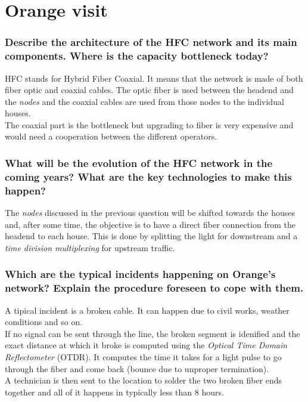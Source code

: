 \documentclass[10pt,a4paper]{ULBreport}
\begin{document}
\chapter{Orange visit}

\subsection{Describe the architecture of the HFC network and its main components. Where
is the capacity bottleneck today?}

HFC stands for Hybrid Fiber Coaxial. It means that the network is made of both fiber optic and coaxial cables. The optic fiber is used between the headend and the \textit{nodes} and the coaxial cables are used from those nodes to the individual houses. \\
The coaxial part is the bottleneck but upgrading to fiber is very expensive and would need a cooperation between the different operators.

\subsection{What will be the evolution of the HFC network in the coming years? What are the key technologies to make this happen?}

The \textit{nodes} discussed in the previous question will be shifted towards the houses and, after some time, the objective is to have a direct fiber connection from the headend to each house. This is done by splitting the light for downstream and a \textit{time division multiplexing} for upstream traffic. 

\subsection{Which are the typical incidents happening on Orange's network? Explain the procedure foreseen to cope with them.}

A tipical incident is a broken cable. It can happen due to civil works, weather conditions and so on. \\
If no signal can be sent through the line, the broken segment is idenified and the exact distance at which it broke is computed using the \textit{Optical Time Domain Reflectometer} (OTDR). It computes the time it takes for a light pulse to go through the fiber and come back (bounce due to unproper termination).\\
A technician is then sent to the location to solder the two broken fiber ends together and all of it happens in typically less than 8 hours.
\end{document}
